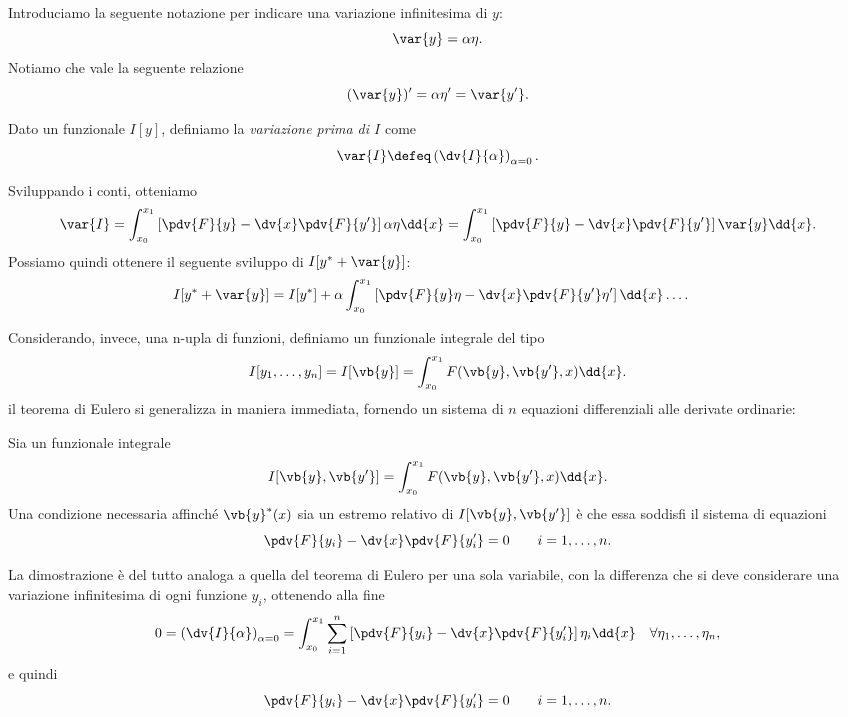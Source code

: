 Introduciamo la seguente notazione per indicare una variazione infinitesima di $y$:
\begin{equation*}
    \var{y} = \alpha \eta.
\end{equation*}
Notiamo che vale la seguente relazione
\begin{equation*}
    (\var{y})' = \alpha \eta' = \var{y'}.
\end{equation*}

\begin{definition}
    Dato un funzionale $I[y]$, definiamo la \emph{variazione prima di $I$} come
    \begin{equation*}
        \var{I} \defeq \left(\dv{I}{\alpha}\right)_{\alpha=0}.
    \end{equation*}
\end{definition}
Sviluppando i conti, otteniamo
\begin{equation*}
    \var{I} = \int_{x_0}^{x_1} \left[\pdv{F}{y} - \dv{x} \pdv{F}{y'}\right] \alpha \eta \dd{x} = \int_{x_0}^{x_1} \left[\pdv{F}{y} - \dv{x} \pdv{F}{y'}\right] \var{y} \dd{x}.
\end{equation*}
Possiamo quindi ottenere il seguente sviluppo di $I[y^* + \var{y}]$:
\begin{align*}
    I[y^* + \var{y}] &= I[y^*] + \alpha \int_{x_0}^{x_1} \left[\pdv{F}{y}\eta - \dv{x} \pdv{F}{y'}\eta'\right]  \dd{x} \dots.
\end{align*}

Considerando, invece, una n-upla di funzioni, definiamo un funzionale integrale del tipo
\begin{equation*}
    I[y_1, \dots, y_n] = I[\vb{y}]= \int_{x_0}^{x_1} F(\vb{y}, \vb{y'}, x)\dd{x}.
\end{equation*}
il teorema di Eulero si generalizza in maniera immediata, fornendo un sistema di $n$ equazioni differenziali alle derivate ordinarie:
\begin{theorem}
    Sia un funzionale integrale
    \begin{equation*}        I[\vb{y}, \vb{y'}] = \int_{x_0}^{x_1} F(\vb{y}, \vb{y'}, x)\dd{x}.
    \end{equation*}
    Una condizione necessaria affinché $\vb{y}^*(x)$ sia un estremo relativo di $I[\vb{y}, \vb{y'}]$ è che essa soddisfi il sistema di equazioni
    \begin{equation*}
        \pdv{F}{y_i} - \dv{x}\pdv{F}{y_i'} = 0 \qquad i = 1, \dots, n.
    \end{equation*}
\end{theorem}
La dimostrazione è del tutto analoga a quella del teorema di Eulero per una sola variabile, con la differenza che si deve considerare una variazione infinitesima di ogni funzione $y_i$, ottenendo alla fine
\begin{equation*}
    0 = \left(\dv{I}{\alpha}\right)_{\alpha=0} = \int_{x_0}^{x_1} \sum_{i=1}^n \left[\pdv{F}{y_i} - \dv{x}\pdv{F}{y_i'}\right] \eta_i \dd{x} \quad \forall \eta_1, \dots, \eta_n,
\end{equation*}
e quindi
\begin{equation*}
    \pdv{F}{y_i} - \dv{x}\pdv{F}{y_i'} = 0 \qquad i = 1, \dots, n.
\end{equation*}

